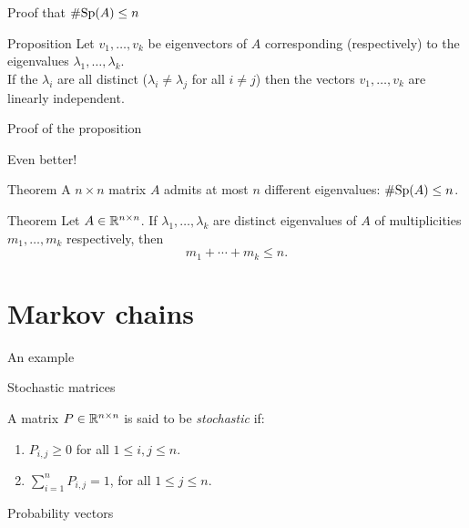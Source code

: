 \documentclass{beamer}
\begin{document}
\begin{frame}[t]{Proof that $\# {{\rm Sp}}(A) \leq n$}
	\grid

	\vspace{-0.4cm}
	\begin{block}{Proposition}
		Let $v_1, \dots, v_k$ be eigenvectors of $A$ corresponding (respectively) to the eigenvalues $\lambda_1, \dots, \lambda_k$.
		\\
		If the $\lambda_i$ are all distinct ($\lambda_i \neq \lambda_j$ for all $i \neq j$) then the vectors $v_1, \dots, v_k$ are linearly independent.
	\end{block}
\end{frame}

\begin{frame}[t]{Proof of the proposition}
	\grid

\end{frame}

\begin{frame}[t]{Even better!}
	\grid

	\begin{block}{Theorem}
		A $n \times n$ matrix $A$ admits at most $n$ different eigenvalues: $\# {{\rm Sp}}(A) \leq n$.
	\end{block}
	\begin{block}{Theorem}
		Let $A \in \mathbb{R}^{n \times n}$. If $\lambda_1, \dots, \lambda_k$ are distinct eigenvalues of $A$ of multiplicities $m_1, \dots, m_k$ respectively, then
		$$
		m_1 + \cdots + m_k \leq n.
		$$
	\end{block}

\end{frame}

\section{Markov chains}

\begin{frame}[t]{An example}
	\grid

\end{frame}

\begin{frame}[t]{Stochastic matrices}
	\grid

	\begin{definition}
		A matrix $P \in \mathbb{R}^{n \times n}$ is said to be \emph{stochastic} if:
		\begin{enumerate}
			\item $P_{i,j} \geq 0$ for all $1 \leq i,j \leq n$.
			\item $\sum\limits_{i=1}^n P_{i,j} = 1$, for all $1 \leq j \leq n$.
		\end{enumerate}
	\end{definition}
\end{frame}
\begin{frame}[t]{Probability vectors}
	\grid

\end{frame}
\end{document}
